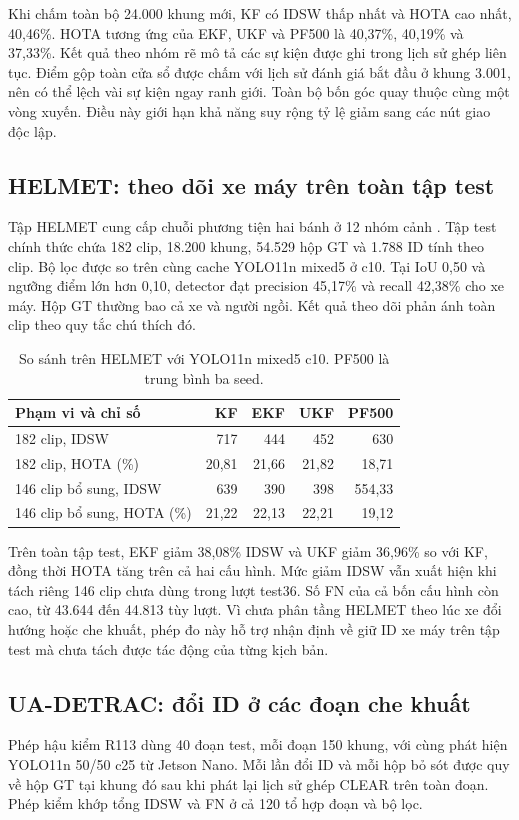 Khi chấm toàn bộ 24.000 khung mới, KF có IDSW thấp nhất và HOTA cao nhất, 40,46\%. HOTA tương ứng của EKF, UKF và PF500 là 40,37\%, 40,19\% và 37,33\%. Kết quả theo nhóm rẽ mô tả các sự kiện được ghi trong lịch sử ghép liên tục. Điểm gộp toàn cửa sổ được chấm với lịch sử đánh giá bắt đầu ở khung 3.001, nên có thể lệch vài sự kiện ngay ranh giới. Toàn bộ bốn góc quay thuộc cùng một vòng xuyến. Điều này giới hạn khả năng suy rộng tỷ lệ giảm sang các nút giao độc lập.

\subsection{HELMET: theo dõi xe máy trên toàn tập test}
Tập HELMET cung cấp chuỗi phương tiện hai bánh ở 12 nhóm cảnh \cite{helmet}. Tập test chính thức chứa 182 clip, 18.200 khung, 54.529 hộp GT và 1.788 ID tính theo clip. Bộ lọc được so trên cùng cache YOLO11n mixed5 ở c10. Tại IoU 0,50 và ngưỡng điểm lớn hơn 0,10, detector đạt precision 45,17\% và recall 42,38\% cho xe máy. Hộp GT thường bao cả xe và người ngồi. Kết quả theo dõi phản ánh toàn clip theo quy tắc chú thích đó.

\begin{table}[htbp]\centering\small
\caption{So sánh trên HELMET với YOLO11n mixed5 c10. PF500 là trung bình ba seed.}\label{tab:helmet}
\begin{tabular}{@{}lrrrr@{}}\toprule
Phạm vi và chỉ số & KF & EKF & UKF & PF500\\\midrule
182 clip, IDSW & 717 & 444 & 452 & 630\\
182 clip, HOTA (\%) & 20,81 & 21,66 & 21,82 & 18,71\\
146 clip bổ sung, IDSW & 639 & 390 & 398 & 554,33\\
146 clip bổ sung, HOTA (\%) & 21,22 & 22,13 & 22,21 & 19,12\\\bottomrule
\end{tabular}
\end{table}
Trên toàn tập test, EKF giảm 38,08\% IDSW và UKF giảm 36,96\% so với KF, đồng thời HOTA tăng trên cả hai cấu hình. Mức giảm IDSW vẫn xuất hiện khi tách riêng 146 clip chưa dùng trong lượt test36. Số FN của cả bốn cấu hình còn cao, từ 43.644 đến 44.813 tùy lượt. Vì chưa phân tầng HELMET theo lúc xe đổi hướng hoặc che khuất, phép đo này hỗ trợ nhận định về giữ ID xe máy trên tập test mà chưa tách được tác động của từng kịch bản.

\subsection{UA-DETRAC: đổi ID ở các đoạn che khuất}
Phép hậu kiểm R113 dùng 40 đoạn test, mỗi đoạn 150 khung, với cùng phát hiện YOLO11n 50/50 c25 từ Jetson Nano. Mỗi lần đổi ID và mỗi hộp bỏ sót được quy về hộp GT tại khung đó sau khi phát lại lịch sử ghép CLEAR trên toàn đoạn. Phép kiểm khớp tổng IDSW và FN ở cả 120 tổ hợp đoạn và bộ lọc.

